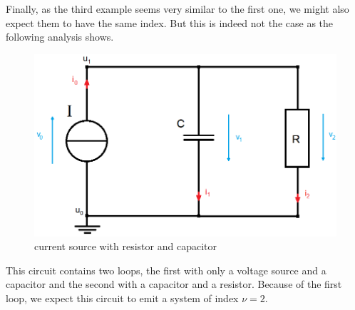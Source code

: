 \begin{example3}
	Finally, as the third example seems very similar to the first one, we might also expect them to have the same index. But this is indeed not the case as the following analysis shows. 
	\begin{figure}[H]
		\centering
		\includegraphics[scale = 0.4]{pictures/Example3.png}
		\caption{current source with resistor and capacitor} 
	\end{figure}
	This circuit contains two loops, the first with only a voltage source and a capacitor and the second with a capacitor and a resistor. Because of the first loop, we expect this circuit to emit a system of index $\nu = 2$.
	

\end{example3}
